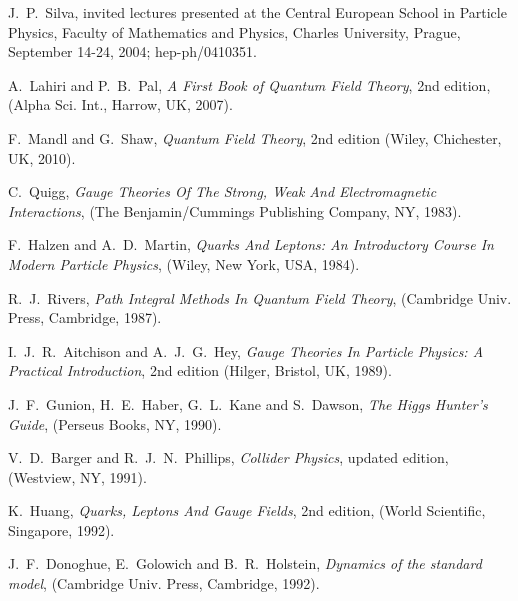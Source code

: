 \documentclass{ws-ijmpa}
\begin{document}
\begin{thebibliography}{00}
J.\ P.\ Silva,
invited lectures presented at the
Central European School in Particle Physics,
Faculty of Mathematics and Physics,
Charles University,
Prague,
September 14-24, 2004;
hep-ph/0410351.

A.~Lahiri and P.~B.~Pal,
\textit{A First Book of Quantum Field Theory}, 
2nd edition, (Alpha Sci. Int., Harrow, UK, 2007).

F.~Mandl and G.~Shaw,
\textit{Quantum Field Theory},
2nd edition (Wiley, Chichester, UK, 2010).


C.~Quigg,
\textit{Gauge Theories Of The Strong, Weak And
Electromagnetic Interactions},
(The Benjamin/Cummings Publishing Company, NY, 1983).

F.~Halzen and A.~D.~Martin,
\textit{Quarks And Leptons: An Introductory Course In Modern Particle Physics},
(Wiley, New York, USA, 1984).

R.~J.~Rivers,
\textit{Path Integral Methods In Quantum Field Theory}, 
(Cambridge Univ. Press, Cambridge, 1987).

I.~J.~R.~Aitchison and A.~J.~G.~Hey,
\textit{Gauge Theories In Particle Physics: A Practical Introduction},
2nd edition (Hilger, Bristol, UK, 1989).

J.~F.~Gunion, H.~E.~Haber, G.~L.~Kane and S.~Dawson,
\textit{The Higgs Hunter's Guide},
(Perseus Books, NY, 1990).

V.~D.~Barger and R.~J.~N.~Phillips,
\textit{Collider Physics},
updated edition, (Westview, NY, 1991).

K.~Huang,
\textit{Quarks, Leptons And Gauge Fields},
2nd edition, (World Scientific, Singapore, 1992).

J.~F.~Donoghue, E.~Golowich and B.~R.~Holstein,
\textit{Dynamics of the standard model},
(Cambridge Univ. Press, Cambridge, 1992).


\end{thebibliography}
\end{document}
